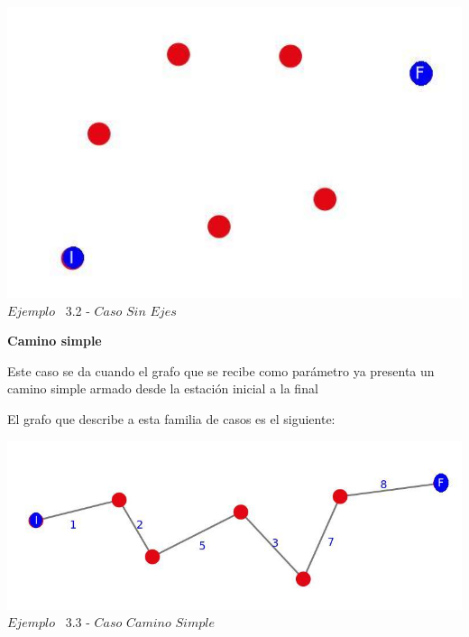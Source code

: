 \vspace*{0.3cm} \vspace*{0.3cm}
  \begin{center}
 \includegraphics[scale=0.5]{./EJ3/grafoSinEjes.jpeg}
 \\{$Ejemplo$ \ 3.2 - $Caso$ $Sin$ $Ejes$}
  \end{center}
  \vspace*{0.3cm}

\begin{center}
 \textbf{Camino simple}
\end{center}

Este caso se da cuando el grafo que se recibe como par\'ametro ya presenta un camino simple armado desde la estaci\'on inicial a la final

El grafo que describe a esta familia de casos es el siguiente:\\

\vspace*{0.3cm} \vspace*{0.3cm}
  \begin{center}
 \includegraphics[scale=0.5]{./EJ3/grafoCaminoSimple.jpeg}
 \\{$Ejemplo$ \ 3.3 - $Caso$ $Camino$ $Simple$}
  \end{center}
  \vspace*{0.3cm}
  
